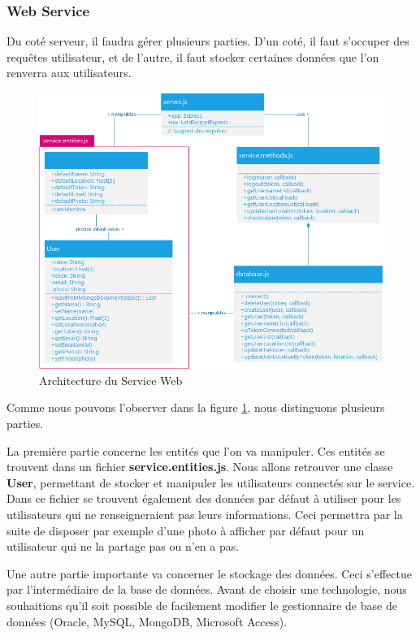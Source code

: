 \subsubsection{Web Service}

    Du coté serveur, il faudra gérer plusieurs parties. D'un coté, il faut s'occuper des requêtes utilisateur, et de l'autre, il faut stocker certaines données que l'on renverra aux utilisateurs.

    \begin{figure}[H]
        \centering
        \includegraphics[width=\textwidth]{./img/architecture-service-web.png}
        \caption{Architecture du Service Web}
        \label{asweb}
    \end{figure}

    Comme nous pouvons l'observer dans la figure \ref{asweb}, nous distinguons plusieurs parties.

    La première partie concerne les entités que l'on va manipuler. Ces entités se trouvent dans un fichier \textbf{service.entities.js}. Nous allons retrouver une classe \textbf{User}, permettant de stocker et manipuler les utilisateurs connectés sur le service. Dans ce fichier se trouvent également des données par défaut à utiliser pour les utilisateurs qui ne renseigneraient pas leurs informations. Ceci permettra par la suite de disposer par exemple d'une photo à afficher par défaut pour un utilisateur qui ne la partage pas ou n'en a pas.

    Une autre partie importante va concerner le stockage des données. Ceci s'effectue par l'intermédiaire de la base de données. Avant de choisir une technologie, nous souhaitions qu'il soit possible de facilement modifier le gestionnaire de base de données (Oracle, MySQL, MongoDB, Microsoft Access).
    
